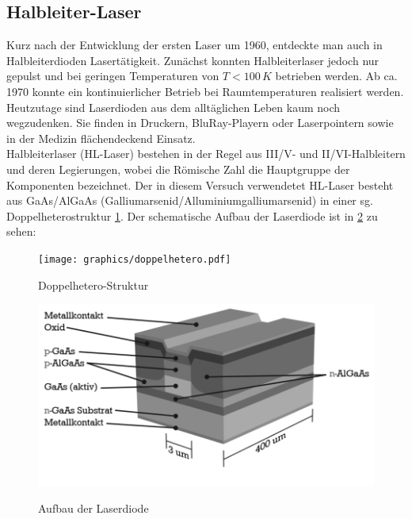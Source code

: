 \documentclass[twoside,colorback,accentcolor=tud4c,11pt]{tudreport}
\begin{document}
\subsection{Halbleiter-Laser}
Kurz nach der Entwicklung der ersten Laser um 1960, entdeckte man auch in Halbleiterdioden Lasertätigkeit. Zunächst konnten Halbleiterlaser jedoch nur gepulst und bei geringen Temperaturen von $T<100\,\si{K}$ betrieben werden. Ab ca. 1970 konnte ein kontinuierlicher Betrieb bei Raumtemperaturen realisiert werden. Heutzutage sind Laserdioden aus dem alltäglichen Leben kaum noch wegzudenken. Sie finden in Druckern, BluRay-Playern oder Laserpointern sowie in der Medizin flächendeckend Einsatz.\\
Halbleiterlaser (HL-Laser) bestehen in der Regel aus III/V- und II/VI-Halbleitern und deren Legierungen, wobei die Römische Zahl die Hauptgruppe der Komponenten bezeichnet. Der in diesem Versuch verwendetet HL-Laser besteht aus GaAs/AlGaAs (Galliumarsenid/Alluminiumgalliumarsenid) in einer sg. Doppelheterostruktur \ref{dophet}. Der schematische Aufbau der Laserdiode ist in \ref{diau} zu sehen:
\begin{figure}[H]
\centering
   	\begin{minipage}[b]{0.6\textwidth}
   	\texttt{[image: graphics/doppelhetero.pdf]}
  	\label{dophet}
  	\caption{Doppelhetero-Struktur}
   	\end{minipage}
\end{figure}
\begin{figure}[H]
\centering
   	\begin{minipage}[b]{0.6\textwidth}
   	\includegraphics[width=\textwidth]{graphics/diodaufb.PNG}
  	\label{diau}
   	\end{minipage}
\caption{Aufbau der Laserdiode\cite{2}} 	
\end{figure}
\end{document}
